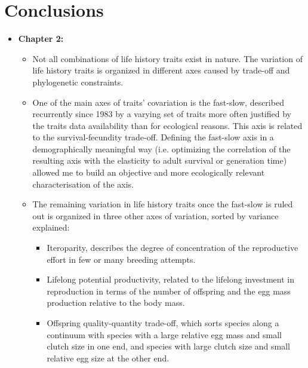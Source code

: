 \clearpage

\section*{Conclusions}

\begin{itemize}

  \item \textbf{Chapter 2:}
  \begin{itemize}
    \item Not all combinations of life history traits exist in nature. The
variation of life history traits is organized in different axes caused by
trade-off and phylogenetic constraints.
    \item One of the main axes of traits' covariation is the fast-slow,
described recurrently since 1983 by a varying set of traits more often
justified by the traits data availability than for ecological reasons. This
axis is related to the survival-fecundity trade-off.
Defining the fast-slow  axis in a demographically meaningful way (i.e.
optimizing the correlation of the resulting axis with the elasticity to adult
survival or generation time) allowed me to build an objective and more
ecologically relevant characterisation of the axis.
    \item The remaining variation in life history traits once the fast-slow
is ruled out is organized in three other axes of variation, sorted by variance
explained:

    \begin{itemize}
      \item Iteroparity, describes the degree of concentration of the
reproductive effort in few or many breeding attempts.
      \item Lifelong potential productivity, related to the lifelong investment
in reproduction in terms of the number of offspring and the egg mass production
relative to the body mass.
      \item Offspring quality-quantity trade-off, which sorts species along a
continuum with species with a large relative egg mass and small clutch size in
one end, and species with large clutch size and small relative egg size at the
other end.
    \end{itemize}
  \end{itemize}



\end{itemize}
